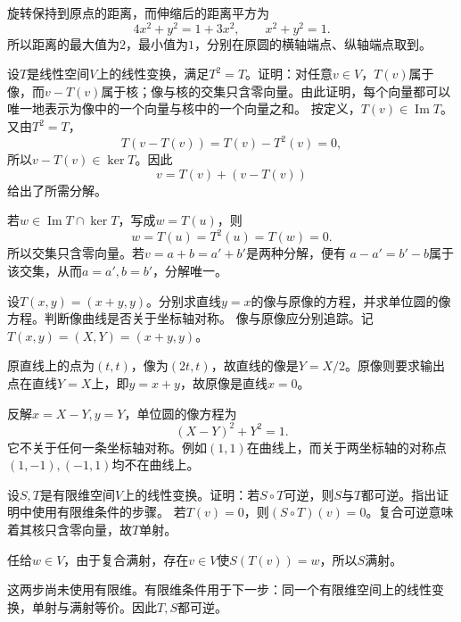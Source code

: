 旋转保持到原点的距离，而伸缩后的距离平方为
\[
4x^2+y^2=1+3x^2,\qquad x^2+y^2=1.
\]
所以距离的最大值为\(2\)，最小值为\(1\)，分别在原圆的横轴端点、纵轴端点取到。


设\(T\)是线性空间\(V\)上的线性变换，满足\(T^{2} = T\)。证明：对任意\(v \in V\)，\(T \left( v \right)\)属于像，而\(v - T \left( v \right)\)属于核；像与核的交集只含零向量。由此证明，每个向量都可以唯一地表示为像中的一个向量与核中的一个向量之和。
\solutionanswer
按定义，\(T(v)\in\operatorname{Im}T\)。又由\(T^2=T\)，
\[
T(v-T(v))=T(v)-T^2(v)=0,
\]
所以\(v-T(v)\in\ker T\)。因此
\[
v=T(v)+(v-T(v))
\]
给出了所需分解。

若\(w\in\operatorname{Im}T\cap\ker T\)，写成\(w=T(u)\)，则
\[
w=T(u)=T^2(u)=T(w)=0.
\]
所以交集只含零向量。若\(v=a+b=a'+b'\)是两种分解，便有
\(a-a'=b'-b\)属于该交集，从而\(a=a',b=b'\)，分解唯一。


设\(T \left( x , y \right) = \left( x + y , y \right)\)。分别求直线\(y = x\)的像与原像的方程，并求单位圆的像方程。判断像曲线是否关于坐标轴对称。
\solutionanswer
像与原像应分别追踪。记\(T(x,y)=(X,Y)=(x+y,y)\)。

原直线上的点为\((t,t)\)，像为\((2t,t)\)，故直线的像是\(Y=X/2\)。原像则要求输出点在直线\(Y=X\)上，即\(y=x+y\)，故原像是直线\(x=0\)。

反解\(x=X-Y,y=Y\)，单位圆的像方程为
\[
(X-Y)^2+Y^2=1.
\]
它不关于任何一条坐标轴对称。例如\((1,1)\)在曲线上，而关于两坐标轴的对称点\((1,-1),(-1,1)\)均不在曲线上。


设\(S , T\)是有限维空间\(V\)上的线性变换。证明：若\(S \circ T\)可逆，则\(S\)与\(T\)都可逆。指出证明中使用有限维条件的步骤。
\solutionanswer
若\(T(v)=0\)，则\((S\circ T)(v)=0\)。复合可逆意味着其核只含零向量，故\(T\)单射。

任给\(w\in V\)，由于复合满射，存在\(v\in V\)使\(S(T(v))=w\)，所以\(S\)满射。

这两步尚未使用有限维。有限维条件用于下一步：同一个有限维空间上的线性变换，单射与满射等价。因此\(T,S\)都可逆。


